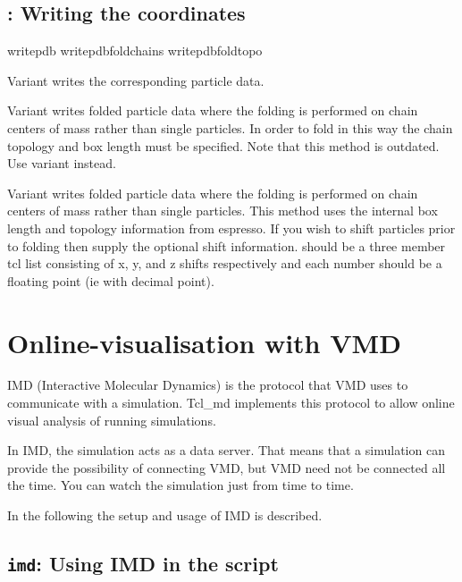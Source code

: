 \subsection{: Writing the coordinates}

\begin{essyntax}
   writepdb 
   writepdbfoldchains  
    
   writepdbfoldtopo  
\end{essyntax}

Variant  writes the corresponding particle data. 

Variant  writes folded particle data where the folding is
performed on chain centers of mass rather than single particles. In
order to fold in this way the chain topology and box length must be
specified.  Note that this method is outdated. Use variant 
instead.

Variant  writes folded particle data where the folding is
performed on chain centers of mass rather than single particles. This
method uses the internal box length and topology information from
espresso. If you wish to shift particles prior to folding then supply
the optional shift information.  should be a three member
tcl list consisting of x, y, and z shifts respectively and each number
should be a floating point (ie with decimal point).

\section{Online-visualisation with VMD}
\label{sec:IMD}

IMD (Interactive Molecular Dynamics) is the protocol that VMD uses to
communicate with a simulation. Tcl\_md implements this protocol to
allow online visual analysis of running simulations.

In IMD, the simulation acts as a data server. That means that a
simulation can provide the possibility of connecting VMD, but VMD need
not be connected all the time. You can watch the simulation just from
time to time.

In the following the setup and usage of IMD is described.

\subsection{\texttt{imd}: Using IMD in the script}

